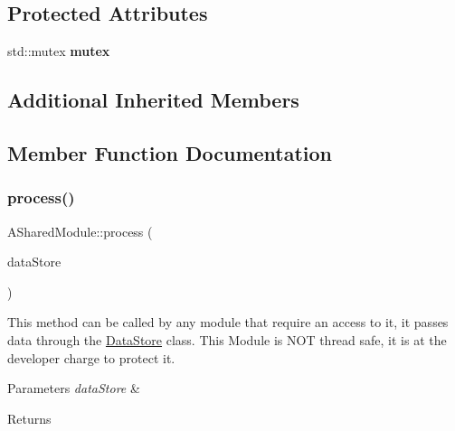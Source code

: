 \subsection*{Protected Attributes}
\begin{DoxyCompactItemize}
\item 
\mbox{\label{classxzia_1_1ASharedModule_a72f3b1b415d80fa6fc644180815ba6ef}} 
std\+::mutex {\bfseries mutex}
\end{DoxyCompactItemize}
\subsection*{Additional Inherited Members}


\subsection{Member Function Documentation}
\mbox{\label{classxzia_1_1ASharedModule_ac836fc027900a9c0dfdec35cb034a0a4}} 
\subsubsection{\texorpdfstring{process()}{process()}}
{\footnotesize\ttfamily A\+Shared\+Module\+::process (\begin{DoxyParamCaption}\item[{\mbox{\hyperlink{classxzia_1_1DataStore}{Data\+Store}} \&}]{data\+Store }\end{DoxyParamCaption})\hspace{0.3cm}{\ttfamily [pure virtual]}}



This method can be called by any module that require an access to it, it passes data through the \mbox{\hyperlink{classxzia_1_1DataStore}{Data\+Store}} class. This Module is N\+OT thread safe, it is at the developer charge to protect it. 


\begin{DoxyParams}{Parameters}
{\em data\+Store} & \\
\hline
\end{DoxyParams}
\begin{DoxyReturn}{Returns}

\end{DoxyReturn}


